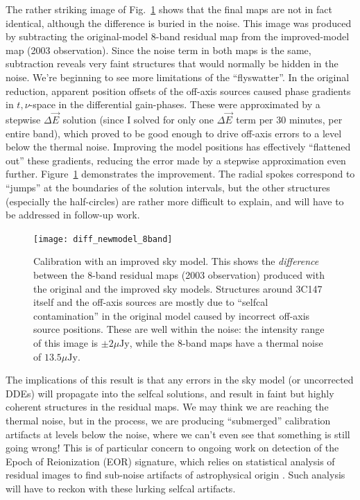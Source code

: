 \documentclass[]{aa}
\newcommand{\jones}[2]{\vec {#1}_{#2}}
\begin{document}
The rather striking image of Fig.~\ref{fig:diff-newmodel} shows that the final maps are not in fact identical, although the difference is buried in the noise. This image was produced by subtracting the original-model 8-band residual map from the improved-model map (2003 observation). 
Since the noise term in both maps is the same, subtraction reveals very faint structures that would normally be hidden in the noise. We're beginning to see more limitations of the ``flyswatter''. In the original reduction, apparent position offsets of the off-axis sources caused phase gradients in $t,\nu$-space in the differential gain-phases. These were approximated by a stepwise $\Delta\jones{E}{}$ solution (since I solved for only one $\Delta\jones{E}{}$ term per 30 minutes, per entire band), which proved to be good enough to drive off-axis errors to a level below the thermal noise. Improving the model positions has effectively ``flattened out'' these gradients, reducing the error made by a stepwise approximation even further. Figure~\ref{fig:diff-newmodel} demonstrates the improvement. The radial spokes correspond to ``jumps'' at the boundaries of the solution intervals, but the other structures (especially the half-circles) are rather more difficult to explain, and will have to be addressed in follow-up work.

\begin{figure}
\begin{centering}
\texttt{[image: diff\_newmodel\_8band]}%
\end{centering}
\caption{\label{fig:diff-newmodel}Calibration with an improved sky model. This shows the \emph{difference} between the 8-band residual maps (2003 observation) produced with the original and the improved sky models. Structures around 3C147 itself and the off-axis sources are mostly due to ``selfcal contamination'' in the original model caused by incorrect off-axis source positions. These are well within the noise: the intensity range of this image is $\pm2 \mu\mathrm{Jy}$, while the 8-band maps have a thermal noise of $13.5 \mu\mathrm{Jy}$.}
\end{figure}

The implications of this result is that any errors in the sky model (or uncorrected DDEs) will propagate into the selfcal solutions, and result in faint but highly coherent structures in the residual maps. We may think we are reaching the thermal noise, but in the process, we are producing ``submerged'' calibration artifacts at levels below the noise, where we can't even see that something is still going wrong! This is of particular concern to ongoing work on detection of the Epoch of Reionization (EOR) signature, which relies on statistical analysis of residual images to find sub-noise artifacts of astrophysical origin \citep{EOR-LOFAR,EOR-MWA}. Such analysis will have to reckon with these lurking selfcal artifacts.
\end{document}
